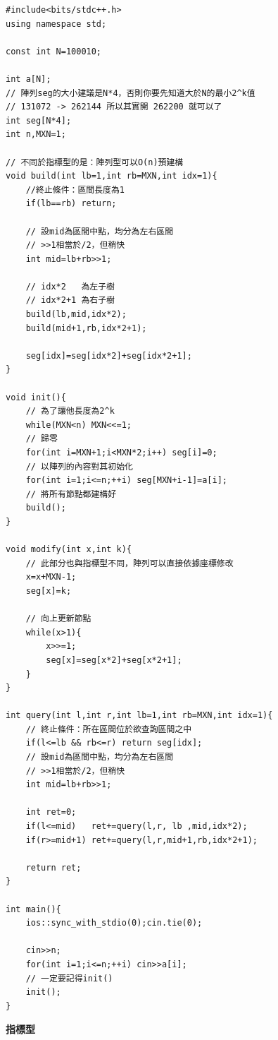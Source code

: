 \begin{lstlisting}[caption=陣列型線段樹]
#include<bits/stdc++.h>
using namespace std;

const int N=100010;

int a[N];
// 陣列seg的大小建議是N*4，否則你要先知道大於N的最小2^k值
// 131072 -> 262144 所以其實開 262200 就可以了
int seg[N*4];
int n,MXN=1;

// 不同於指標型的是：陣列型可以O(n)預建構
void build(int lb=1,int rb=MXN,int idx=1){
    //終止條件：區間長度為1
    if(lb==rb) return;
    
    // 設mid為區間中點，均分為左右區間
    // >>1相當於/2，但稍快
    int mid=lb+rb>>1;
    
    // idx*2   為左子樹
    // idx*2+1 為右子樹
    build(lb,mid,idx*2);
    build(mid+1,rb,idx*2+1);
    
    seg[idx]=seg[idx*2]+seg[idx*2+1];
}

void init(){
    // 為了讓他長度為2^k
    while(MXN<n) MXN<<=1;
    // 歸零
    for(int i=MXN+1;i<MXN*2;i++) seg[i]=0;
    // 以陣列的內容對其初始化
    for(int i=1;i<=n;++i) seg[MXN+i-1]=a[i];
    // 將所有節點都建構好
    build();
} 

void modify(int x,int k){
    // 此部分也與指標型不同，陣列可以直接依據座標修改
    x=x+MXN-1;
    seg[x]=k;
    
    // 向上更新節點
    while(x>1){
        x>>=1;
        seg[x]=seg[x*2]+seg[x*2+1];
    }
}

int query(int l,int r,int lb=1,int rb=MXN,int idx=1){
    // 終止條件：所在區間位於欲查詢區間之中
    if(l<=lb && rb<=r) return seg[idx];
    // 設mid為區間中點，均分為左右區間
    // >>1相當於/2，但稍快
    int mid=lb+rb>>1;

    int ret=0;
    if(l<=mid)   ret+=query(l,r, lb ,mid,idx*2);
    if(r>=mid+1) ret+=query(l,r,mid+1,rb,idx*2+1);
    
    return ret;
}

int main(){
    ios::sync_with_stdio(0);cin.tie(0);
    
    cin>>n;
    for(int i=1;i<=n;++i) cin>>a[i];
    // 一定要記得init()
    init();
}    
\end{lstlisting}

    \textbf{指標型}


